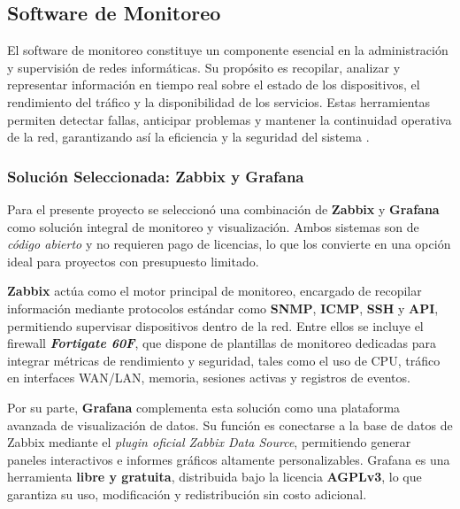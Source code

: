 \subsection{Software de Monitoreo}

El software de monitoreo constituye un componente esencial en la administración y supervisión de redes informáticas. Su propósito es recopilar, analizar y representar información en tiempo real sobre el estado de los dispositivos, el rendimiento del tráfico y la disponibilidad de los servicios. Estas herramientas permiten detectar fallas, anticipar problemas y mantener la continuidad operativa de la red, garantizando así la eficiencia y la seguridad del sistema \parencite{Orozco2022}.

\subsubsection{Solución Seleccionada: Zabbix y Grafana}

Para el presente proyecto se seleccionó una combinación de \textbf{Zabbix} y \textbf{Grafana} como solución integral de monitoreo y visualización. Ambos sistemas son de \textit{código abierto} y no requieren pago de licencias, lo que los convierte en una opción ideal para proyectos con presupuesto limitado.

\textbf{Zabbix} actúa como el motor principal de monitoreo, encargado de recopilar información mediante protocolos estándar como \textbf{SNMP}, \textbf{ICMP}, \textbf{SSH} y \textbf{API}, permitiendo supervisar dispositivos dentro de la red. Entre ellos se incluye el firewall \textbf{\textit{Fortigate 60F}}, que dispone de plantillas de monitoreo dedicadas para integrar métricas de rendimiento y seguridad, tales como el uso de CPU, tráfico en interfaces WAN/LAN, memoria, sesiones activas y registros de eventos.

Por su parte, \textbf{Grafana} complementa esta solución como una plataforma avanzada de visualización de datos. Su función es conectarse a la base de datos de Zabbix mediante el \textit{plugin oficial Zabbix Data Source}, permitiendo generar paneles interactivos e informes gráficos altamente personalizables. Grafana es una herramienta \textbf{libre y gratuita}, distribuida bajo la licencia \textbf{AGPLv3}, lo que garantiza su uso, modificación y redistribución sin costo adicional.

